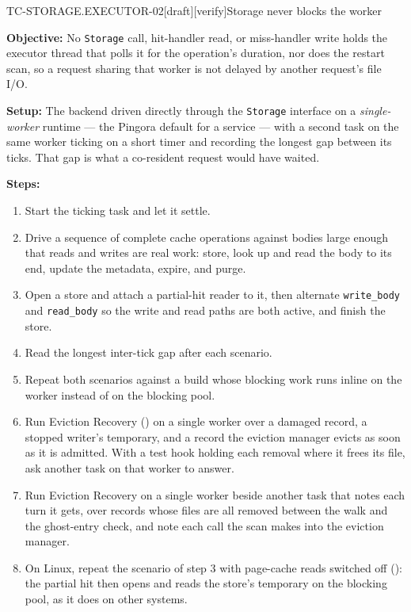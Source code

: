 \begin{requirement}{TC-STORAGE.EXECUTOR-02}[draft][verify]{Storage never blocks the worker}


  \textbf{Objective:} No \texttt{Storage} call, hit-handler read, or
  miss-handler write holds the executor thread that polls it for the
  operation's duration, nor does the restart scan, so a request sharing that
  worker is not delayed by another request's file I/O.

  \textbf{Setup:} The backend driven directly through the \texttt{Storage}
  interface on a \emph{single-worker} runtime --- the Pingora default for a
  service --- with a second task on the same worker ticking on a short timer
  and recording the longest gap between its ticks. That gap is what a
  co-resident request would have waited.

  \textbf{Steps:}
  \begin{enumerate}
    \item Start the ticking task and let it settle.
    \item Drive a sequence of complete cache operations against bodies large
      enough that reads and writes are real work: store, look up and read the
      body to its end, update the metadata, expire, and purge.
    \item Open a store and attach a partial-hit reader to it, then alternate
      \texttt{write\_body} and \texttt{read\_body} so the write and read
      paths are both active, and finish the store.
    \item Read the longest inter-tick gap after each scenario.
    \item Repeat both scenarios against a build whose blocking work runs
      inline on the worker instead of on the blocking pool.
    \item Run Eviction Recovery () on a
      single worker over a damaged record, a stopped writer's temporary, and
      a record the eviction manager evicts as soon as it is admitted. With a
      test hook holding each removal where it frees its file, ask another
      task on that worker to answer.
    \item Run Eviction Recovery on a single worker beside another task that
      notes each turn it gets, over records whose files are all removed
      between the walk and the ghost-entry check, and note each call the
      scan makes into the eviction manager.
    \item On Linux, repeat the scenario of step 3 with page-cache reads
      switched off (): the partial hit then
      opens and reads the store's temporary on the blocking pool, as it does
      on other systems.
  \end{enumerate}


\end{requirement}
